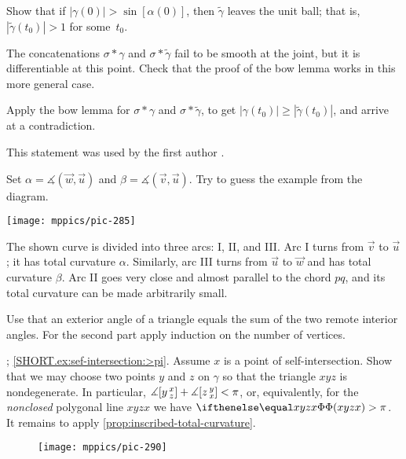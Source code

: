 \begin{multicols}{2}
Show that if $|\gamma(0)|> \sin[\alpha(0)]$, then $\tilde\gamma$ leaves the unit ball; that is, $|\tilde\gamma(t_0)|>1$ for some~$t_0$.

The concatenations $\sigma*\gamma$ and $\sigma*\tilde\gamma$ fail to be smooth at the joint, but it is differentiable at this point.
Check that the proof of the bow lemma works in this more general case.

Apply the bow lemma for $\sigma*\gamma$ and $\sigma*\tilde\gamma$, to get $|\gamma(t_0)|\ge |\tilde\gamma(t_0)|$, and arrive at a contradiction.

 This statement was used by the first author \cite{petrunin2023}.


Set $\alpha=\measuredangle(\vec w,\vec u)$ 
and $\beta=\measuredangle(\vec v,\vec u)$.
Try to guess the example from the diagram.

\begin{Figure}
\vskip-1mm
\centering
\texttt{[image: mppics/pic-285]}
\vskip-1mm
\end{Figure}

The shown curve is divided into three arcs: I, II, and III. 
Arc I turns from $\vec v$ to $\vec u$;
it has total curvature $\alpha$.
Similarly, arc III turns from $\vec u$ to $\vec w$ and has total curvature $\beta$. 
Arc II goes very close and almost parallel to the chord $pq$, and its total curvature can be made arbitrarily small.


Use that an exterior angle of a triangle equals the sum of the two remote interior angles.
For the second part apply induction on the number of vertices.


\parbf{\ref{ex:sef-intersection}}; 
\ref{SHORT.ex:sef-intersection:>pi}. Assume $x$ is a point of self-intersection.
Show that we may choose two points $y$ and $z$ on $\gamma$ so that the triangle $xyz$ is nondegenerate.
In particular, 
$\measuredangle\hinge yxz
\z+
\measuredangle\hinge zyx
<\pi$, or, equivalently, for the \textit{nonclosed} polygonal line $xyzx$ we have $\tc{xyzx}\z>\pi$.
It remains to apply \ref{prop:inscribed-total-curvature}.

\begin{wrapfigure}{r}{23 mm}
\vskip-3mm
\centering
\texttt{[image: mppics/pic-290]}
\vskip-0mm
\end{wrapfigure}


\end{multicols}
